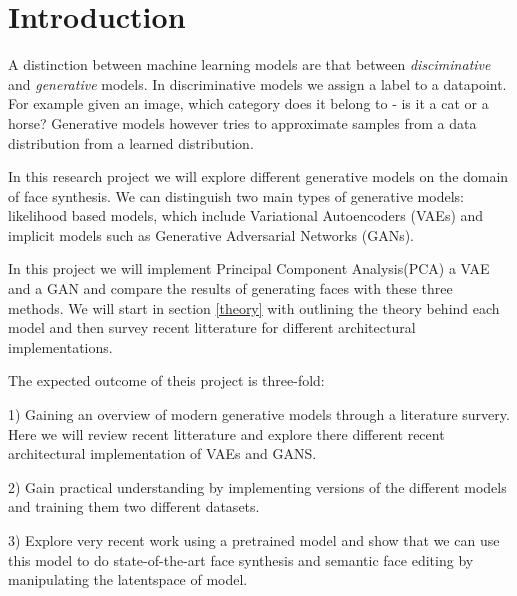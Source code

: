\section{Introduction}

A distinction between machine learning models are that between \emph{disciminative} and \emph{generative} models. In discriminative models we assign a label to a datapoint. For example given an image, which category does it belong to - is it a cat or a horse? Generative models however tries to approximate samples from a data distribution from a learned distribution.

In this research project we will explore different generative models on the domain of face synthesis. We can distinguish two main types of generative models: likelihood based models, which include Variational Autoencoders (VAEs) and implicit models such as Generative Adversarial Networks (GANs)\cite{vqvae2}.

In this project we will implement Principal Component Analysis(PCA) a VAE and a GAN and compare the results of generating faces with these three methods. We will start in section \ref{theory} with outlining the theory behind each model and  then survey recent litterature for different architectural implementations. 

The expected outcome of theis project is three-fold:

1) Gaining an overview of modern generative models through a literature survery. Here we will review recent litterature and explore there different recent architectural implementation of VAEs and GANS. 

2) Gain practical understanding by implementing versions of the different models and training them two different datasets.

3) Explore very recent work using  a pretrained model and show that we can use this model to do state-of-the-art face synthesis and semantic face editing by manipulating the latentspace of model.
